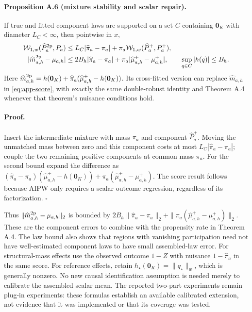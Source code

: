 \paragraph{Proposition A.6 (mixture stability and scalar repair).}
If true and fitted component laws are supported on a set $C$ containing $\mathbf0_K$ with diameter $L_C<\infty$, then pointwise in $x$,
\begin{align}
 \mathcal W_{1,w}(\widehat P_a^{\rm 2p},P_a)
 &\leq L_C|\widehat\pi_a-\pi_a|+
 \pi_a\mathcal W_{1,w}(\widehat P_a^+,P_a^+),\label{eq:app-mixture}\\
 |\widehat m_{a,h}^{\rm 2p}-\mu_{a,h}|
 &\leq2B_h|\widehat\pi_a-\pi_a|+
 \pi_a|\widehat\mu_{a,h}^+-\mu_{a,h}^+|,\qquad \sup_{q\in C}|h(q)|\leq B_h.\nonumber
\end{align}
Here $\widehat m_{a,h}^{\rm 2p}=h(\mathbf0_K)+\widehat\pi_a(\widehat\mu_{a,h}^+-h(\mathbf0_K))$. Its cross-fitted version can replace $\widehat m_{a,h}$ in \eqref{eq:app-score}, with exactly the same double-robust identity and Theorem A.4 whenever that theorem's nuisance conditions hold.

\paragraph{Proof.}
Insert the intermediate mixture with mass $\pi_a$ and component $\widehat P_a^+$. Moving the unmatched mass between zero and this component costs at most $L_C|\widehat\pi_a-\pi_a|$; couple the two remaining positive components at common mass $\pi_a$. For the second bound expand the difference as $(\widehat\pi_a-\pi_a)(\widehat\mu_{a,h}^+-h(\mathbf0_K))+\pi_a(\widehat\mu_{a,h}^+-\mu_{a,h}^+)$. The score result follows because AIPW only requires a scalar outcome regression, regardless of its factorization. $\square$

Thus $\|\widehat m_{a,h}^{\rm 2p}-\mu_{a,h}\|_2$ is bounded by $2B_h\|\widehat\pi_a-\pi_a\|_2+\|\pi_a(\widehat\mu_{a,h}^+-\mu_{a,h}^+)\|_2$. These are the component errors to combine with the propensity rate in Theorem A.4. The law bound also shows that regions with vanishing participation need not have well-estimated component laws to have small assembled-law error. For structural-mass effects use the observed outcome $1-Z$ with nuisance $1-\widehat\pi_a$ in the same score. For reference effects, retain $h_\star(\mathbf0_K)=\|q_\star\|_w$, which is generally nonzero. No new causal identification assumption is needed merely to calibrate the assembled scalar mean. The reported two-part experiments remain plug-in experiments: these formulas establish an available calibrated extension, not evidence that it was implemented or that its coverage was tested.

